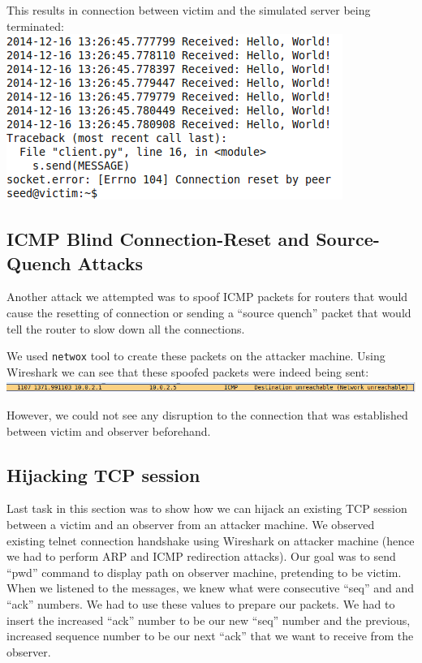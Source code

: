 \documentclass[12pt, a4paper]{article}
\begin{document}
This results in connection between victim and the simulated server being terminated:\\
\includegraphics[width=.95\textwidth]{gfx/python.png}

\subsection{ICMP Blind Connection-Reset and Source-Quench Attacks}

Another attack we attempted was to spoof ICMP packets for routers that would cause the resetting of connection or sending a ``source quench'' packet that would tell the router to slow down all the connections.

We used \texttt{netwox} tool to create these packets on the attacker machine.
Using Wireshark we can see that these spoofed packets were indeed being sent:\\

\includegraphics[width=.95\textwidth]{gfx/unrechable.png}

However, we could not see any disruption to the connection that was established between victim and observer beforehand.


\subsection{Hijacking TCP session}

Last task in this section was to show how we can hijack an existing TCP session
between a victim and an observer from an attacker machine. We observed existing telnet
connection handshake using Wireshark on attacker machine (hence we had to perform ARP and ICMP redirection attacks).
Our goal was to send ``pwd'' command to display path on observer machine, pretending to be victim. When we listened to the
messages, we knew what were consecutive ``seq'' and and ``ack'' numbers. We had to use these values to prepare our packets. We had to insert
the increased ``ack'' number to be our new ``seq'' number and the previous, increased sequence number to be our next ``ack'' that we want to receive from the observer.\\
\end{document}
